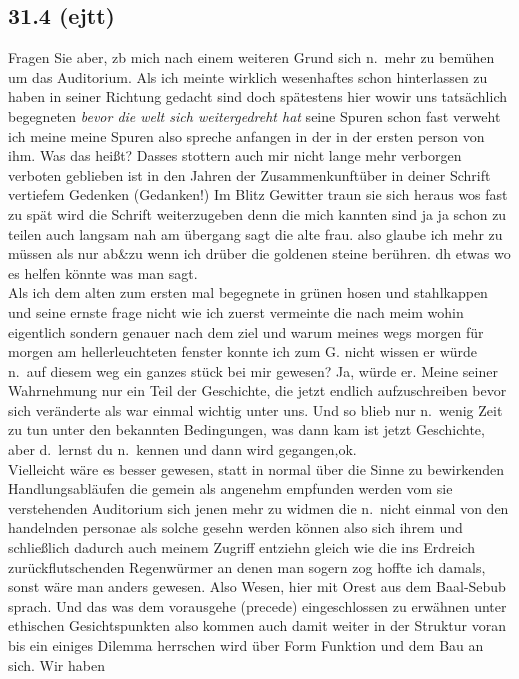 \documentclass[
]{article}
\author{}
\date{\vspace{-2.5em}}
\begin{document}
\subsection{31.4 (ejtt)}\label{ejtt}

Fragen Sie aber, zb mich nach einem weiteren Grund sich n.~mehr zu
bemühen um das Auditorium. Als ich meinte wirklich wesenhaftes schon
hinterlassen zu haben in seiner Richtung gedacht sind doch spätestens
hier wowir uns tatsächlich begegneten \emph{bevor die welt sich
weitergedreht hat }seine Spuren schon fast verweht ich meine meine
Spuren also spreche anfangen in der in der ersten person von ihm. Was
das heißt? Dasses stottern auch mir nicht lange mehr verborgen verboten
geblieben ist in den Jahren der Zusammenkunftüber in deiner Schrift
vertiefem Gedenken (Gedanken!) Im Blitz Gewitter traun sie sich heraus
wos fast zu spät wird die Schrift weiterzugeben denn die mich kannten
sind ja ja schon zu teilen auch langsam nah am übergang sagt die alte
frau. also glaube ich mehr zu müssen als nur ab\&zu wenn ich drüber die
goldenen steine berühren. dh etwas wo es helfen könnte was man sagt.\\
Als ich dem alten zum ersten mal begegnete in grünen hosen und
stahlkappen und seine ernste frage nicht wie ich zuerst vermeinte die
nach meim wohin eigentlich sondern genauer nach dem ziel und warum
meines wegs morgen für morgen am hellerleuchteten fenster konnte ich zum
G. nicht wissen er würde n.~auf diesem weg ein ganzes stück bei mir
gewesen? Ja, würde er. Meine seiner Wahrnehmung nur ein Teil der
Geschichte, die jetzt endlich aufzuschreiben bevor sich veränderte als
war einmal wichtig unter uns. Und so blieb nur n.~wenig Zeit zu tun
unter den bekannten Bedingungen, was dann kam ist jetzt Geschichte, aber
d.~lernst du n.~kennen und dann wird gegangen,ok.\\
Vielleicht wäre es besser gewesen, statt in normal über die Sinne zu
bewirkenden Handlungsabläufen die gemein als angenehm empfunden werden
vom sie verstehenden Auditorium sich jenen mehr zu widmen die n.~nicht
einmal von den handelnden personae als solche gesehn werden können also
sich ihrem und schließlich dadurch auch meinem Zugriff entziehn gleich
wie die ins Erdreich zurückflutschenden Regenwürmer an denen man sogern
zog hoffte ich damals, sonst wäre man anders gewesen. Also Wesen, hier
mit Orest aus dem Baal-Sebub sprach. Und das was dem vorausgehe
(precede) eingeschlossen zu erwähnen unter ethischen Gesichtspunkten
also kommen auch damit weiter in der Struktur voran bis ein einiges
Dilemma herrschen wird über Form Funktion und dem Bau an sich. Wir haben
\end{document}
